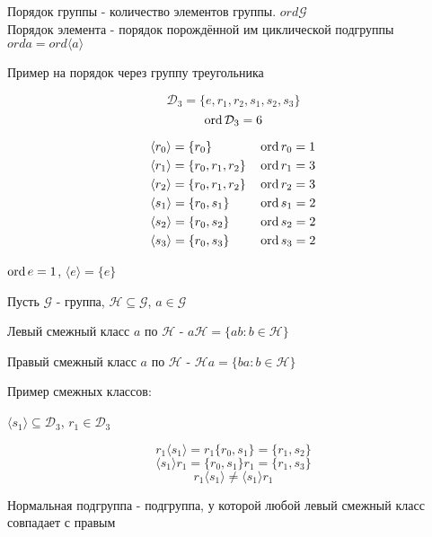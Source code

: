 \documentclass[../main/document.tex]{subfiles}
\begin{document}
\begin{dfn}
Порядок группы - количество элементов группы. $ord\mathcal{G}$\\
Порядок элемента - порядок порождённой им циклической подгруппы $orda=ord\langle a\rangle$
\end{dfn}

\begin{exm}
Пример на порядок через группу треугольника

$$\mathcal{D}_3=\{e,r_1,r_2,s_1,s_2,s_3\}$$
$$\operatorname{ord} \mathcal{D}_3=6$$

\begin{align*}
&\langle r_0\rangle=\{r_0\} & &\operatorname{ord} r_0=1\\
&\langle r_1\rangle=\{r_0,r_1,r_2\} & &\operatorname{ord} r_1=3\\
&\langle r_2\rangle=\{r_0,r_1,r_2\} & &\operatorname{ord} r_2=3\\
&\langle s_1\rangle=\{r_0,s_1\} & &\operatorname{ord} s_1=2\\
&\langle s_2\rangle=\{r_0,s_2\} & &\operatorname{ord} s_2=2\\
&\langle s_3\rangle=\{r_0,s_3\} & &\operatorname{ord} s_3=2
\end{align*}

\end{exm}

\begin{cnsq}
$\operatorname{ord} e=1$, $\langle e\rangle=\{e\}$
\end{cnsq}
\begin{dfn}
Пусть $\mathcal{G}$ - группа, $\mathcal{H}\subseteq \mathcal{G}$, $a\in \mathcal{G}$

Левый смежный класс $a$ по $\mathcal{H}$ - $a\mathcal{H}=\{ab: b\in \mathcal{H}\}$

Правый смежный класс $a$ по $\mathcal{H}$ - $\mathcal{H}a=\{ba: b\in \mathcal{H}\}$
\end{dfn}

\begin{exm}
Пример смежных классов:

$\langle s_1\rangle \subseteq \mathcal{D}_3$, $r_1\in \mathcal{D}_3$

$$r_1\langle s_1\rangle = r_1\{r_0,s_1\}=\{r_1,s_2\}$$
$$\langle s_1\rangle r_1 = \{r_0,s_1\}r_1=\{r_1,s_3\}$$
$$r_1\langle s_1\rangle \neq \langle s_1\rangle r_1$$
\end{exm}

\begin{dfn}
Нормальная подгруппа - подгруппа, у которой любой левый смежный класс совпадает с правым
\end{dfn}
\end{document}
